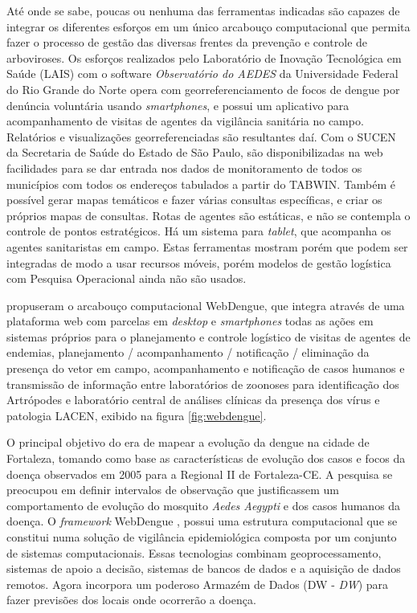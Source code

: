 Até onde se sabe, poucas ou nenhuma das ferramentas indicadas são capazes de integrar os diferentes esforços em um único arcabouço computacional que permita fazer o processo de gestão das diversas frentes da prevenção e controle de arboviroses. Os esforços realizados pelo Laboratório de Inovação Tecnológica em Saúde (LAIS) com o software \emph{Observatório do AEDES} da Universidade Federal do Rio Grande do Norte opera com georreferenciamento de focos de dengue por denúncia voluntária usando \emph{smartphones}, e possui um aplicativo para acompanhamento de visitas de agentes da vigilância sanitária no campo. Relatórios e visualizações georreferenciadas são resultantes daí. Com o SUCEN da Secretaria de Saúde do Estado de São Paulo, são disponibilizadas na web facilidades para se dar entrada nos dados de monitoramento de todos os municípios com todos os endereços tabulados a partir do TABWIN. Também é possível gerar mapas temáticos e fazer várias consultas específicas, e criar os próprios mapas de consultas. Rotas de agentes são estáticas, e não se contempla o controle de pontos estratégicos. Há um sistema para \emph{tablet}, que acompanha os agentes sanitaristas em campo. Estas ferramentas mostram porém que podem ser integradas de modo a usar recursos móveis, porém modelos de gestão logística com Pesquisa Operacional ainda não são usados. 

 propuseram o arcabouço computacional WebDengue, que integra através de uma plataforma web com parcelas em \emph{desktop} e \emph{smartphones} todas as ações em sistemas próprios para o planejamento e controle logístico de visitas de agentes de endemias, planejamento / acompanhamento / notificação / eliminação da presença do vetor em campo, acompanhamento e notificação de casos humanos e transmissão de informação entre laboratórios de zoonoses para identificação dos Artrópodes e laboratório central de análises clínicas da presença dos vírus e patologia \acrshort{LACEN}, exibido na figura \ref{fig:webdengue}.

O principal objetivo do  era de mapear a evolução da dengue na cidade de Fortaleza, tomando como base as características de evolução dos casos e focos da doença observados em 2005 para a Regional II de Fortaleza-CE. A pesquisa se preocupou em definir intervalos de observação que justificassem um comportamento de evolução do mosquito \emph{Aedes Aegypti} e dos casos humanos da doença. O \textit{framework} WebDengue \cite{webdengue2008}, possui uma estrutura computacional que se constitui numa solução de vigilância epidemiológica composta por um conjunto de sistemas computacionais. Essas tecnologias combinam geoprocessamento, sistemas de apoio a decisão, sistemas de bancos de dados e a aquisição de dados remotos. Agora incorpora um poderoso Armazém de Dados (\acrshort{DW} - \textit{\acrlong{DW}}) para fazer previsões dos locais onde ocorrerão a doença.

